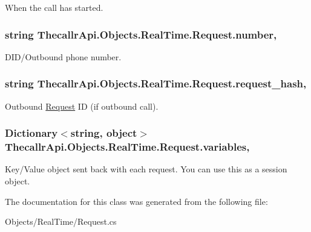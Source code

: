 When the call has started. 

\hypertarget{class_thecallr_api_1_1_objects_1_1_real_time_1_1_request_a944c8d2e0794ccc9f2eab565194cc6d6}{
\subsubsection[{number}]{\setlength{\rightskip}{0pt plus 5cm}string Thecallr\+Api.\+Objects.\+Real\+Time.\+Request.\+number\hspace{0.3cm}{\ttfamily [get]}, {\ttfamily [set]}}}\label{class_thecallr_api_1_1_objects_1_1_real_time_1_1_request_a944c8d2e0794ccc9f2eab565194cc6d6}


D\+I\+D/\+Outbound phone number. 

\hypertarget{class_thecallr_api_1_1_objects_1_1_real_time_1_1_request_aaeadcbd8def6779be7f6765234c7fe1c}{
\subsubsection[{request\+\_\+hash}]{\setlength{\rightskip}{0pt plus 5cm}string Thecallr\+Api.\+Objects.\+Real\+Time.\+Request.\+request\+\_\+hash\hspace{0.3cm}{\ttfamily [get]}, {\ttfamily [set]}}}\label{class_thecallr_api_1_1_objects_1_1_real_time_1_1_request_aaeadcbd8def6779be7f6765234c7fe1c}


Outbound \hyperlink{class_thecallr_api_1_1_objects_1_1_real_time_1_1_request}{Request} I\+D (if outbound call). 

\hypertarget{class_thecallr_api_1_1_objects_1_1_real_time_1_1_request_afc3423f28ec2b5f75b5ba4f9919eb61b}{
\subsubsection[{variables}]{\setlength{\rightskip}{0pt plus 5cm}Dictionary$<$string, object$>$ Thecallr\+Api.\+Objects.\+Real\+Time.\+Request.\+variables\hspace{0.3cm}{\ttfamily [get]}, {\ttfamily [set]}}}\label{class_thecallr_api_1_1_objects_1_1_real_time_1_1_request_afc3423f28ec2b5f75b5ba4f9919eb61b}


Key/\+Value object sent back with each request. You can use this as a session object. 



The documentation for this class was generated from the following file\+:\begin{DoxyCompactItemize}
\item 
Objects/\+Real\+Time/Request.\+cs\end{DoxyCompactItemize}
